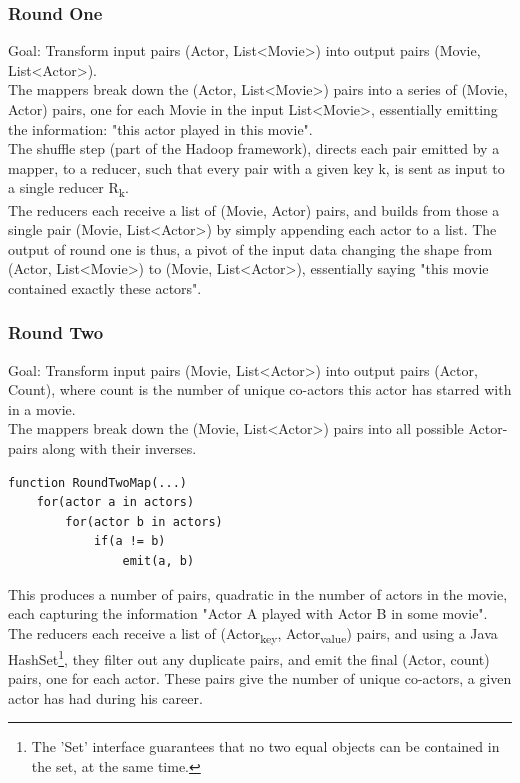 \documentclass[a4paper,11pt]{article}
\begin{document}
\subsubsection{Round One}
Goal: Transform input pairs (Actor, List<Movie>) into output pairs (Movie, List<Actor>).\\

The mappers break down the (Actor, List<Movie>) pairs into a series of (Movie, Actor) pairs, one for each Movie in the input List<Movie>, essentially emitting the information: "this actor played in this movie".\\

The shuffle step (part of the Hadoop framework), directs each pair emitted by a mapper, to a reducer, such that every pair with a given key k, is sent as input to a single reducer R\textsubscript{k}.\\

The reducers each receive a list of (Movie, Actor) pairs, and builds from those a single pair (Movie, List<Actor>) by simply appending each actor to a list. The output of round one is thus, a pivot of the input data changing the shape from (Actor, List<Movie>) to (Movie, List<Actor>), essentially saying "this movie contained exactly these actors".

\subsubsection{Round Two}
\label{sub}
Goal: Transform input pairs (Movie, List<Actor>) into output pairs (Actor, Count), where count is the number of unique co-actors this actor has starred with in a movie.\\

The mappers break down the (Movie, List<Actor>) pairs into all possible Actor-pairs along with their inverses.

\begin{verbatim}
function RoundTwoMap(...)
    for(actor a in actors)
        for(actor b in actors)
            if(a != b)
                emit(a, b)
\end{verbatim}

This produces a number of pairs, quadratic in the number of actors in the movie, each capturing the information "Actor A played with Actor B in some movie".\\

The reducers each receive a list of (Actor\textsubscript{key}, Actor\textsubscript{value}) pairs, and using a Java HashSet\footnote{The 'Set' interface guarantees that no two equal objects can be contained in the set, at the same time.}, they filter out any duplicate pairs, and emit the final (Actor, count) pairs, one for each actor. These pairs give the number of unique co-actors, a given actor has had during his career.
\end{document}
